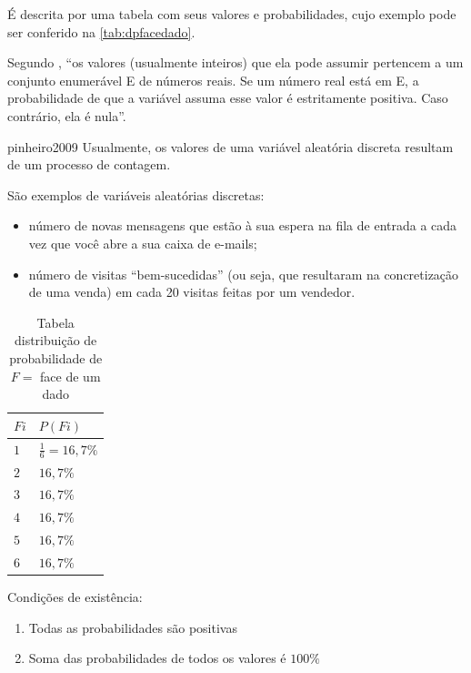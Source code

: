 \documentclass[a4paper]{article}
\begin{document}
	É descrita por uma tabela com seus valores e probabilidades, cujo exemplo pode ser conferido na \autoref{tab:dpfacedado}.
	
	Segundo , ``os valores (usualmente inteiros) que ela pode assumir pertencem a um conjunto enumerável E de números reais. Se um número real está em E, a probabilidade de que a variável assuma esse valor é estritamente positiva. Caso contrário, ela é nula''.
	
	\begin{displaycquote}[p. 98]{pinheiro2009}
	Usualmente, os valores de uma variável aleatória discreta resultam de um processo de contagem.
	
	São exemplos de variáveis aleatórias discretas:
	
		\begin{itemize}
			\item número de novas mensagens que estão à sua espera na fila de entrada a cada vez
			que você abre a sua caixa de e-mails;
			\item número de visitas ``bem-sucedidas'' (ou seja, que resultaram na concretização de
			uma venda) em cada 20 visitas feitas por um vendedor.
		\end{itemize}
	\end{displaycquote}
	
	\begin{table}[h]
		\centering
		\caption{Tabela distribuição de probabilidade de $F =$ face de um dado}
		\label{tab:dpfacedado}
		\begin{tabular}{l|l}
			\textbf{$Fi$} & \textbf{$P(Fi)$} \\ \hline
			$1$ & $\frac{1}{6}=16,7\%$ \\
			$2$ & $16,7\%$ \\
			$3$ & $16,7\%$ \\
			$4$ & $16,7\%$ \\
			$5$ & $16,7\%$ \\
			$6$ & $16,7\%$
		\end{tabular}
	\end{table}

	Condições de existência:
	
	\begin{enumerate}
		\item Todas as probabilidades são positivas
		\item Soma das probabilidades de todos os valores é $100\%$
	\end{enumerate}
	
\end{document}
